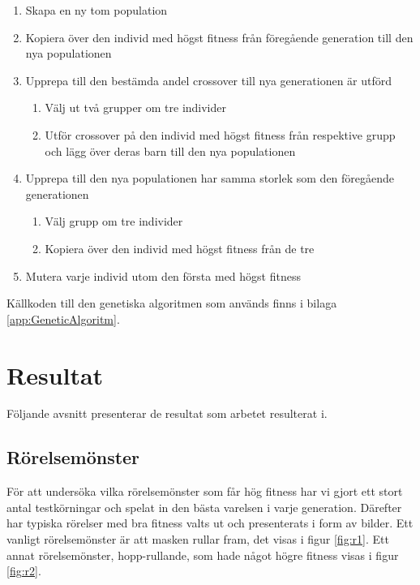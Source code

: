 \documentclass[titlepage, twocolumn, a4paper, 11pt, swedish]{article}
\begin{document}
\begin{enumerate}
\item Skapa en ny tom population
\item Kopiera över den individ med högst fitness från föregående generation till den nya populationen
\item Upprepa till den bestämda andel crossover till nya generationen är utförd
\begin{enumerate}
\item Välj ut två grupper om tre individer
\item Utför crossover på den individ med högst fitness från respektive grupp och lägg över deras barn till den nya populationen
\end{enumerate}
\item Upprepa till den nya populationen har samma storlek som den föregående generationen
\begin{enumerate}
\item Välj grupp om tre individer
\item Kopiera över den individ med högst fitness från de tre
\end{enumerate}
\item Mutera varje individ utom den första med högst fitness
\end{enumerate}

Källkoden till den genetiska algoritmen som används finns i bilaga \vref{app:GeneticAlgoritm}.

\section{Resultat}

Följande avsnitt presenterar de resultat som arbetet resulterat i.

\subsection{Rörelsemönster}
För att undersöka vilka rörelsemönster som får hög fitness har vi gjort ett stort antal testkörningar och spelat in den bästa varelsen i varje generation. Därefter har typiska rörelser med bra fitness valts ut och presenterats i form av bilder. Ett vanligt rörelsemönster är att masken rullar fram, det visas i figur \vref{fig:r1}. Ett annat rörelsemönster, hopp-rullande, som hade något högre fitness visas i figur \vref{fig:r2}.
\end{document}
